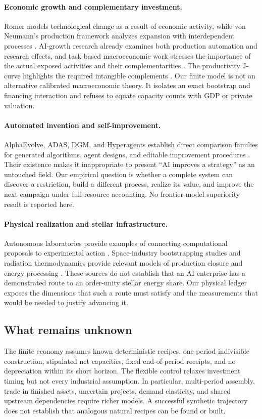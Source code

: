 \documentclass[11pt,letterpaper]{article}
\newcommand{\1}{\mathbf 1}
\theoremstyle{remark}\newtheorem{remark}{Remark}[section]
\begin{document}
\paragraph{Economic growth and complementary investment.}
Romer models technological change as a result of economic activity, while von Neumann's production framework analyzes expansion with interdependent processes \citep{romer,vonneumann}. AI-growth research already examines both production automation and research effects, and task-based macroeconomic work stresses the importance of the actual exposed activities and their complementarities \citep{aghion,acemoglu}. The productivity J-curve highlights the required intangible complements \citep{jcurve}. Our finite model is not an alternative calibrated macroeconomic theory. It isolates an exact bootstrap and financing interaction and refuses to equate capacity counts with GDP or private valuation.

\paragraph{Automated invention and self-improvement.}
AlphaEvolve, ADAS, DGM, and Hyperagents establish direct comparison families for generated algorithms, agent designs, and editable improvement procedures \citep{alphaevolve,adas,dgm,hyperagents}. Their existence makes it inappropriate to present ``AI improves a strategy'' as an untouched field. Our empirical question is whether a complete system can discover a restriction, build a different process, realize its value, and improve the next campaign under full resource accounting. No frontier-model superiority result is reported here.

\paragraph{Physical realization and stellar infrastructure.}
Autonomous laboratories provide examples of connecting computational proposals to experimental action \citep{alab}. Space-industry bootstrapping studies and radiation thermodynamics provide relevant models of production closure and energy processing \citep{metzger,wright}. These sources do not establish that an AI enterprise has a demonstrated route to an order-unity stellar energy share. Our physical ledger exposes the dimensions that such a route must satisfy and the measurements that would be needed to justify advancing it.

\subsection{What remains unknown}
The finite economy assumes known deterministic recipes, one-period indivisible construction, stipulated net capacities, fixed end-of-period receipts, and no depreciation within its short horizon. The flexible control relaxes investment timing but not every industrial assumption. In particular, multi-period assembly, trade in finished assets, uncertain projects, demand elasticity, and shared upstream dependencies require richer models. A successful synthetic trajectory does not establish that analogous natural recipes can be found or built.
\end{document}
